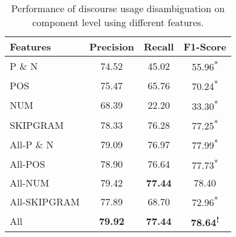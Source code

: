 \begin{table}[ht]
\centering
\begin{tabular}{|l|c|c|c|}
\hline

Features        &     Precision &     Recall &     F1-Score                 \\ \hline
P \& N          &     74.52     &     45.02  &     55.96\textsuperscript{*} \\ \hline
POS             &     75.47     &     65.76  &     70.24\textsuperscript{*} \\ \hline
NUM             &     68.39     &     22.20  &     33.30\textsuperscript{*} \\ \hline
SKIPGRAM        &     78.33     &     76.28  &     77.25\textsuperscript{*} \\ \hline
All-P \& N      &     79.09     &     76.97  &     77.99\textsuperscript{*} \\ \hline
All-POS         &     78.90     &     76.64  &     77.73\textsuperscript{*} \\ \hline
All-NUM         &     79.42     & \bf 77.44  &     78.40\textsuperscript{ } \\ \hline
All-SKIPGRAM    &     77.89     &     68.70  &     72.96\textsuperscript{*} \\ \hline
All             & \bf 79.92     & \bf 77.44  & \bf 78.64\textsuperscript{!} \\ \hline


\end{tabular}
\caption{\label{t:recognition-features} Performance of discourse usage
disambiguation on component level using different features. }
\end{table}
